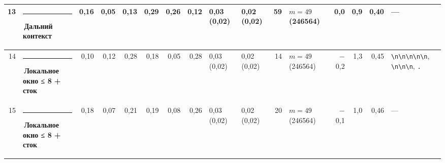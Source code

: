 \documentclass[10pt]{article}
\begin{document}
\begin{minipage}{\linewidth}
\begin{center}
{\begin{tabular}{|r|l|r|r|r|r|r|r|l|l|r|l|r|r|r|l|}
13 & \textcolor[HTML]{C3C2B7}{\rule{0.62em}{0.62em}}\,Дальний контекст & 0,16 & 0,05 & 0,13 & 0,29 & 0,26 & 0,12 & 0,03 (0,02) & 0,02 (0,02) & 59 & $m{=}49$ (246564) & 0,0 & 0,9 & 0,40 & — \\ \hline
14 & \textcolor[HTML]{1BAF7A}{\rule{0.62em}{0.62em}}\,\textbf{Локальное окно ≤ 8 + сток} & 0,10 & 0,12 & 0,28 & 0,18 & 0,05 & 0,28 & 0,03 (0,02) & 0,02 (0,02) & 14 & $m{=}49$ (246564) & $-$0,2 & 1,3 & 0,45 & \texttt{\textvisiblespace{}\textbackslash{}n\textbackslash{}n\textbackslash{}n\textbackslash{}n\textbackslash{}n}, \texttt{\textvisiblespace{}\textbackslash{}n\textbackslash{}n\textbackslash{}n}, \texttt{\textvisiblespace{}.} \\ \hline
15 & \textcolor[HTML]{1BAF7A}{\rule{0.62em}{0.62em}}\,\textbf{Локальное окно ≤ 8 + сток} & 0,18 & 0,07 & 0,21 & 0,19 & 0,08 & 0,26 & 0,03 (0,02) & 0,02 (0,02) & 20 & $m{=}49$ (246564) & $-$0,1 & 1,0 & 0,46 & — \\ \hline
\hline\end{tabular}}\end{center}
\end{minipage}
\par\vspace{0.4em}
\end{document}
